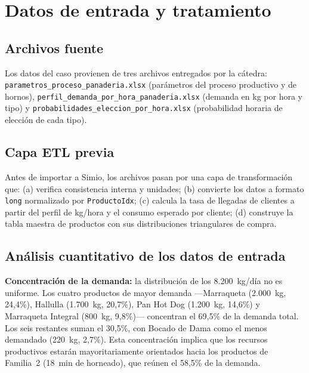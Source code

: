 \documentclass[12pt]{article}
\begin{document}
\newpage
\section{Datos de entrada y tratamiento}

\subsection{Archivos fuente}

Los datos del caso provienen de tres archivos entregados por la cátedra: \texttt{parametros\_proceso\_panaderia.xlsx} (parámetros del proceso productivo y de hornos), \texttt{perfil\_demanda\_por\_hora\_panaderia.xlsx} (demanda en kg por hora y tipo) y \texttt{probabilidades\_eleccion\_por\_hora.xlsx} (probabilidad horaria de elección de cada tipo).

\subsection{Capa ETL previa}

Antes de importar a Simio, los archivos pasan por una capa de transformación que: (a) verifica consistencia interna y unidades; (b) convierte los datos a formato \texttt{long} normalizado por \texttt{ProductoIdx}; (c) calcula la tasa de llegadas de clientes a partir del perfil de kg/hora y el consumo esperado por cliente; (d) construye la tabla maestra de productos con sus distribuciones triangulares de compra.

\subsection{Análisis cuantitativo de los datos de entrada}

\textbf{Concentración de la demanda:} la distribución de los 8.200~kg/día no es uniforme. Los cuatro productos de mayor demanda ---Marraqueta (2.000~kg, 24,4\%), Hallulla (1.700~kg, 20,7\%), Pan Hot Dog (1.200~kg, 14,6\%) y Marraqueta Integral (800~kg, 9,8\%)--- concentran el 69,5\% de la demanda total. Los seis restantes suman el 30,5\%, con Bocado de Dama como el menos demandado (220~kg, 2,7\%). Esta concentración implica que los recursos productivos estarán mayoritariamente orientados hacia los productos de Familia~2 (18~min de horneado), que reúnen el 58,5\% de la demanda.
\end{document}
